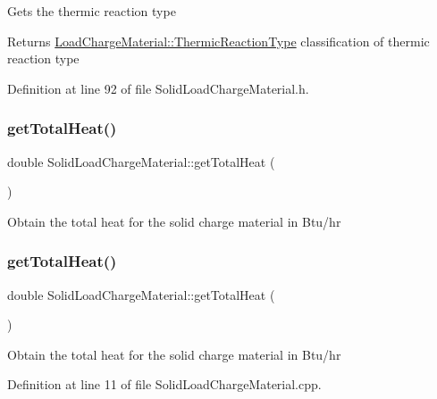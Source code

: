 Gets the thermic reaction type \begin{DoxyReturn}{Returns}
\hyperlink{class_load_charge_material_a51d4263e865a5d86236622dd3fe23fd1}{Load\+Charge\+Material\+::\+Thermic\+Reaction\+Type} classification of thermic reaction type 
\end{DoxyReturn}


Definition at line 92 of file Solid\+Load\+Charge\+Material.\+h.

\mbox{\label{class_solid_load_charge_material_af8593eb758c64236a8a026d6145584f4}} 
\subsubsection{\texorpdfstring{get\+Total\+Heat()}{getTotalHeat()}\hspace{0.1cm}{\footnotesize\ttfamily [1/3]}}
{\footnotesize\ttfamily double Solid\+Load\+Charge\+Material\+::get\+Total\+Heat (\begin{DoxyParamCaption}{ }\end{DoxyParamCaption})}

Obtain the total heat for the solid charge material in Btu/hr \mbox{\label{class_solid_load_charge_material_af8593eb758c64236a8a026d6145584f4}} 
\subsubsection{\texorpdfstring{get\+Total\+Heat()}{getTotalHeat()}\hspace{0.1cm}{\footnotesize\ttfamily [2/3]}}
{\footnotesize\ttfamily double Solid\+Load\+Charge\+Material\+::get\+Total\+Heat (\begin{DoxyParamCaption}{ }\end{DoxyParamCaption})}

Obtain the total heat for the solid charge material in Btu/hr 

Definition at line 11 of file Solid\+Load\+Charge\+Material.\+cpp.

